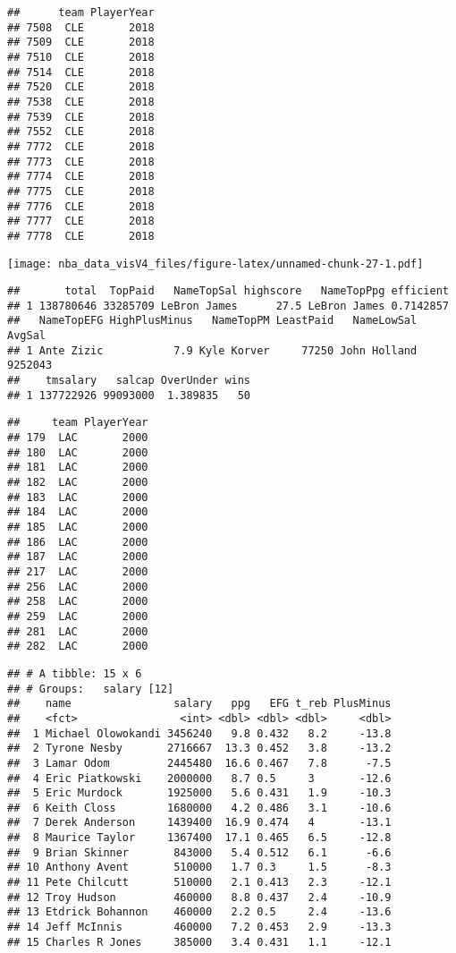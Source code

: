 \documentclass[]{article}
\begin{document}
\begin{verbatim}
##      team PlayerYear
## 7508  CLE       2018
## 7509  CLE       2018
## 7510  CLE       2018
## 7514  CLE       2018
## 7520  CLE       2018
## 7538  CLE       2018
## 7539  CLE       2018
## 7552  CLE       2018
## 7772  CLE       2018
## 7773  CLE       2018
## 7774  CLE       2018
## 7775  CLE       2018
## 7776  CLE       2018
## 7777  CLE       2018
## 7778  CLE       2018
\end{verbatim}

\texttt{[image: nba\_data\_visV4\_files/figure-latex/unnamed-chunk-27-1.pdf]}

\begin{verbatim}
##       total  TopPaid   NameTopSal highscore   NameTopPpg efficient
## 1 138780646 33285709 LeBron James      27.5 LeBron James 0.7142857
##   NameTopEFG HighPlusMinus   NameTopPM LeastPaid   NameLowSal  AvgSal
## 1 Ante Zizic           7.9 Kyle Korver     77250 John Holland 9252043
##    tmsalary   salcap OverUnder wins
## 1 137722926 99093000  1.389835   50
\end{verbatim}

\begin{verbatim}
##     team PlayerYear
## 179  LAC       2000
## 180  LAC       2000
## 181  LAC       2000
## 182  LAC       2000
## 183  LAC       2000
## 184  LAC       2000
## 185  LAC       2000
## 186  LAC       2000
## 187  LAC       2000
## 217  LAC       2000
## 256  LAC       2000
## 258  LAC       2000
## 259  LAC       2000
## 281  LAC       2000
## 282  LAC       2000
\end{verbatim}

\begin{verbatim}
## # A tibble: 15 x 6
## # Groups:   salary [12]
##    name                salary   ppg   EFG t_reb PlusMinus
##    <fct>                <int> <dbl> <dbl> <dbl>     <dbl>
##  1 Michael Olowokandi 3456240   9.8 0.432   8.2     -13.8
##  2 Tyrone Nesby       2716667  13.3 0.452   3.8     -13.2
##  3 Lamar Odom         2445480  16.6 0.467   7.8      -7.5
##  4 Eric Piatkowski    2000000   8.7 0.5     3       -12.6
##  5 Eric Murdock       1925000   5.6 0.431   1.9     -10.3
##  6 Keith Closs        1680000   4.2 0.486   3.1     -10.6
##  7 Derek Anderson     1439400  16.9 0.474   4       -13.1
##  8 Maurice Taylor     1367400  17.1 0.465   6.5     -12.8
##  9 Brian Skinner       843000   5.4 0.512   6.1      -6.6
## 10 Anthony Avent       510000   1.7 0.3     1.5      -8.3
## 11 Pete Chilcutt       510000   2.1 0.413   2.3     -12.1
## 12 Troy Hudson         460000   8.8 0.437   2.4     -10.9
## 13 Etdrick Bohannon    460000   2.2 0.5     2.4     -13.6
## 14 Jeff McInnis        460000   7.2 0.453   2.9     -13.3
## 15 Charles R Jones     385000   3.4 0.431   1.1     -12.1
\end{verbatim}
\end{document}
